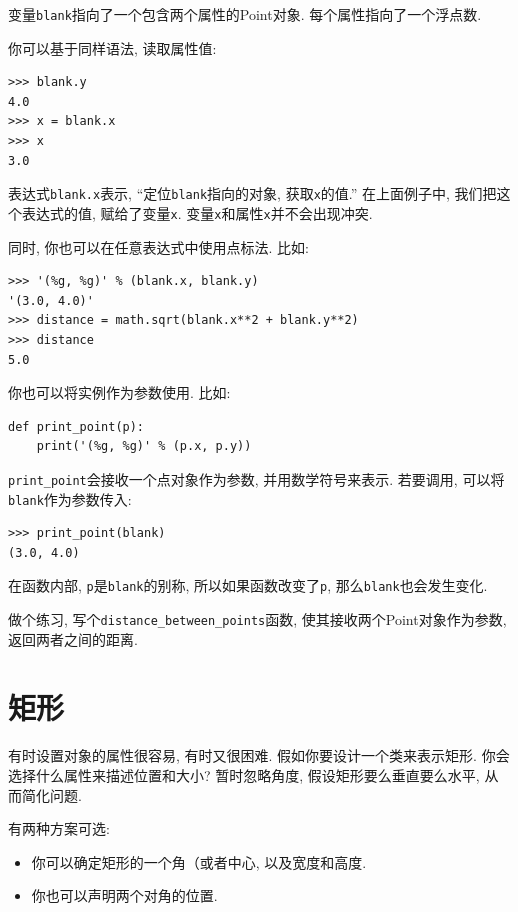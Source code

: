 \documentclass[10pt]{book}
\begin{document}
变量{\tt blank}指向了一个包含两个属性的Point对象. 
每个属性指向了一个浮点数. 

你可以基于同样语法, 读取属性值:

\begin{verbatim}
>>> blank.y
4.0
>>> x = blank.x
>>> x
3.0
\end{verbatim}
%
表达式{\tt blank.x}表示, ``定位{\tt blank}指向的对象, 获取{\tt x}的值.''
在上面例子中,  我们把这个表达式的值, 赋给了变量{\tt x}. 
变量{\tt x}和属性{\tt x}并不会出现冲突. 

同时, 你也可以在任意表达式中使用点标法. 比如:

\begin{verbatim}
>>> '(%g, %g)' % (blank.x, blank.y)
'(3.0, 4.0)'
>>> distance = math.sqrt(blank.x**2 + blank.y**2)
>>> distance
5.0
\end{verbatim}
%
你也可以将实例作为参数使用. 比如:

\begin{verbatim}
def print_point(p):
    print('(%g, %g)' % (p.x, p.y))
\end{verbatim}
%
\verb"print_point"会接收一个点对象作为参数, 并用数学符号来表示. 
若要调用, 可以将{\tt blank}作为参数传入:

\begin{verbatim}
>>> print_point(blank)
(3.0, 4.0)
\end{verbatim}
%
在函数内部, {\tt p}是{\tt blank}的别称, 所以如果函数改变了{\tt p}, 
那么{\tt blank}也会发生变化. 

做个练习, 写个\verb"distance_between_points"函数, 
使其接收两个Point对象作为参数, 返回两者之间的距离. 



\section{矩形}
\label{rectangles}

有时设置对象的属性很容易, 有时又很困难. 
假如你要设计一个类来表示矩形. 你会选择什么属性来描述位置和大小?
暂时忽略角度, 假设矩形要么垂直要么水平, 从而简化问题. 

有两种方案可选: 

\begin{itemize}

\item 你可以确定矩形的一个角（或者中心, 以及宽度和高度. 

\item 你也可以声明两个对角的位置. 

\end{itemize}
\end{document}
